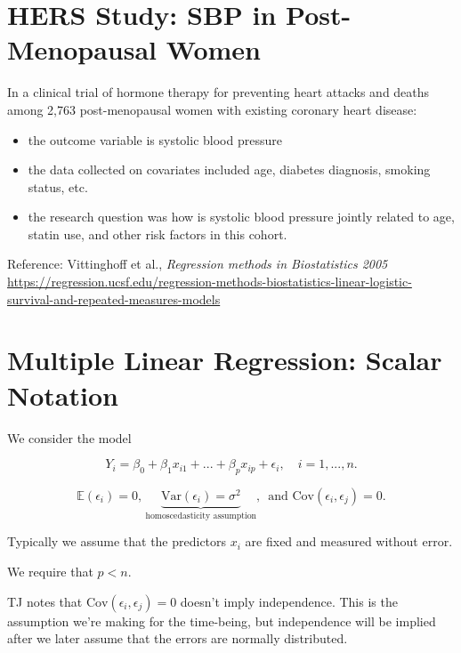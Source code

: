 \documentclass[
  letterpaper,
  DIV=11,
  numbers=noendperiod]{scrreport}
\providecommand{\tightlist}{%
  \setlength{\itemsep}{0pt}\setlength{\parskip}{0pt}}\usepackage{longtable,booktabs,array}
\begin{document}
\hypertarget{hers-study-sbp-in-post-menopausal-women}{%
\section{HERS Study: SBP in Post-Menopausal
Women}\label{hers-study-sbp-in-post-menopausal-women}}

In a clinical trial of hormone therapy for preventing heart attacks and
deaths among 2,763 post-menopausal women with existing coronary heart
disease:

\begin{itemize}
\tightlist
\item
  the outcome variable is systolic blood pressure
\item
  the data collected on covariates included age, diabetes diagnosis,
  smoking status, etc.
\item
  the research question was how is systolic blood pressure jointly
  related to age, statin use, and other risk factors in this cohort.
\end{itemize}

Reference: Vittinghoff et al., \emph{Regression methods in Biostatistics
2005}
\url{https://regression.ucsf.edu/regression-methods-biostatistics-linear-logistic-survival-and-repeated-measures-models}

\hypertarget{multiple-linear-regression-scalar-notation}{%
\section{Multiple Linear Regression: Scalar
Notation}\label{multiple-linear-regression-scalar-notation}}

We consider the model

\[Y_i = \beta_0 + \beta_1 x_{i1} + ... + \beta_p x_{ip} + \epsilon_i, \quad i = 1, ..., n.\]

\[\mathbb E(\epsilon_i) = 0, \, \underbrace{\text{Var}(\epsilon_i) = \sigma^2}_{\text{homoscedasticity assumption}}, \, \text{ and Cov}(\epsilon_i, \epsilon_j) = 0.\]

Typically we assume that the predictors \(x_i\) are fixed and measured
without error.

We require that \(p < n\).

TJ notes that \(\text{Cov}(\epsilon_i, \epsilon_j) = 0\) doesn't imply
independence. This is the assumption we're making for the time-being,
but independence will be implied after we later assume that the errors
are normally distributed.
\end{document}
